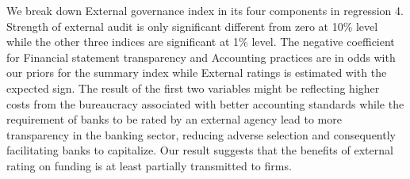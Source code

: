 \documentclass[12pt]{article}
\begin{document}
We break down External governance index in its four components in regression 4. Strength of external audit is only significant different from zero at 10\% level while the other three indices are significant at 1\% level. The negative coefficient for Financial statement transparency and Accounting practices are in odds with our priors for the summary index while External ratings is estimated with the expected sign. The result of the first two variables might be reflecting higher costs from the bureaucracy associated with better accounting standards while the requirement of banks to be rated by an external agency lead to more transparency in the banking sector, reducing adverse selection and consequently facilitating banks to capitalize. Our result suggests that the benefits of external rating on funding is at least partially transmitted to firms.         
    	
	    	
\end{document}
